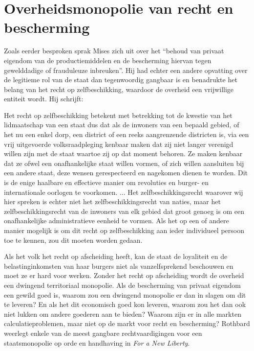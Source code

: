 \hypertarget{overheidsmonopolie-van-recht-en-bescherming}{%
\section{Overheidsmonopolie van recht en bescherming}\label{overheidsmonopolie-van-recht-en-bescherming}}

Zoals eerder besproken sprak Mises zich uit over het ``behoud van privaat eigendom van de productiemiddelen en de bescherming hiervan tegen gewelddadige of frauduleuze inbreuken''. Hij had echter een andere opvatting over de legitieme rol van de staat dan tegenwoordig gangbaar is en benadrukte het belang van het recht op zelfbeschikking, waardoor de overheid een vrijwillige entiteit wordt. Hij schrijft:

\begin{blockquotebox}
Het recht op zelfbeschikking betekent met betrekking tot de kwestie van het lidmaatschap van een staat dus dat als de inwoners van een bepaald gebied, of het nu een enkel dorp, een district of een reeks aangrenzende districten is, via een vrij uitgevoerde volksraadpleging kenbaar maken dat zij niet langer verenigd willen zijn met de staat waartoe zij op dat moment behoren. Ze maken kenbaar dat ze ofwel een onafhankelijke staat willen vormen, of zich willen aansluiten bij een andere staat, deze wensen gerespecteerd en nagekomen dienen te worden. Dit is de enige haalbare en effectieve manier om revoluties en burger- en internationale oorlogen te voorkomen. ... Het zelfbeschikkingsrecht waarover wij hier spreken is echter niet het zelfbeschikkingsrecht van naties, maar het zelfbeschikkingsrecht van de inwoners van elk gebied dat groot genoeg is om een onafhankelijke administratieve eenheid te vormen. Als het op een of andere manier mogelijk is om dit recht op zelfbeschikking aan ieder individueel persoon toe te kennen, zou dit moeten worden gedaan.\footnotemark
\end{blockquotebox}
\autocite{204}

Als het volk het recht op afscheiding heeft, kan de staat de loyaliteit en de belastinginkomsten van haar burgers niet als vanzelfsprekend beschouwen en moet ze er hard voor werken. Zonder het recht op afscheiding wordt de overheid een dwingend territoriaal monopolie. Als de bescherming van privaat eigendom een gewild goed is, waarom zou een dwingend monopolie er dan in slagen om dit te leveren? En als het dit economisch goed kon leveren, waarom zou het dan ook niet lukken om andere goederen aan te bieden? Waarom zijn er in alle markten calculatieproblemen, maar niet op de markt voor recht en bescherming? Rothbard weerlegt enkele van de meest gangbare rechtvaardigingen voor een staatsmonopolie op orde en handhaving in \emph{For a New Liberty}.\autocite{205}

